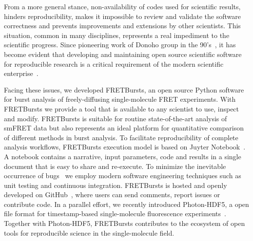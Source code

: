 From a more general stance, non-availability of codes
used for scientific results, hinders reproducibility,
makes it impossible to review and validate the software correctness
and prevents improvements and extensions by other scientists.
This situation, common in many disciplines,
represents a real impediment to the scientific progress.
Since pioneering work of Donoho group in the 90's~\cite{Buckheit_1995},
it has become evident that developing and maintaining open source scientific software
for reproducible research is a critical requirement of the modern
scientific enterprise~\cite{Ince_2012,Vihinen_2015}.


Facing these issues, we developed FRETBursts,
an open source Python software for burst analysis of freely-diffusing
single-molecule FRET experiments.
With FRETBursts we provide a tool that is available to any scientist
to use, inspect and modify. FRETBursts is suitable for routine state-of-the-art
analysis of smFRET data but also represents an ideal platform
for quantitative comparison of different methods in burst analysis.
To facilitate reproducibility of complete analysis
workflows, FRETBursts execution model is based on Juyter Notebook~\cite{Shen_2014}.
A notebook contains a narrative, input parameters, code and 
results in a single document that is easy to share and re-execute.
To minimize the inevitable occurrence of bugs~\cite{Soergel_2015} 
we employ modern software engineering techniques
such as unit testing and continuous integration.
FRETBursts is hosted and openly developed on GitHub~\cite{Blischak_2016,Prli__2012},
where users can send comments, report issues or contribute code.
In a parallel effort, we recently introduced Photon-HDF5,
a open file format for timestamp-based single-molecule fluorescence
experiments~\cite{Ingargiola2016}. Together with Photon-HDF5,
FRETBursts contributes to the ecosystem
of open tools for reproducible science in the single-molecule field.

